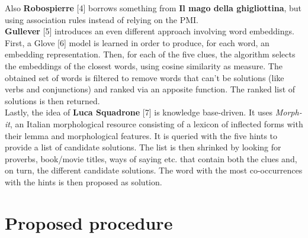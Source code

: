 \documentclass[twoside,twocolumn]{article}
\begin{document}
Also \textbf{Robospierre} [4] borrows something from \textbf{Il mago della ghigliottina}, but using association rules instead of relying on the PMI. \\
\textbf{Gullever} [5] introduces an even different approach involving word embeddings. First, a Glove [6] model is learned in order to produce, for each word, an embedding representation. Then, for each of the five clues, the algorithm selects the embeddings of the closest words, using cosine similarity as measure. The obtained set of words is filtered to remove words that can't be solutions (like verbs and conjunctions) and ranked via an apposite function. The ranked list of solutions is then returned. \\
Lastly, the idea of \textbf{Luca Squadrone} [7] is knowledge base-driven. It uses \textit{Morph-it}, an Italian morphological resource consisting of a lexicon of inflected forms with their lemma and morphological features. It is queried with the five hints to provide a list of candidate solutions. The list is then shrinked by looking for proverbs, book/movie titles, ways of saying etc. that contain both the clues and, on turn, the different candidate solutions. The word with the most co-occurrences with the hints is then proposed as solution.

\section{Proposed procedure}
\end{document}
